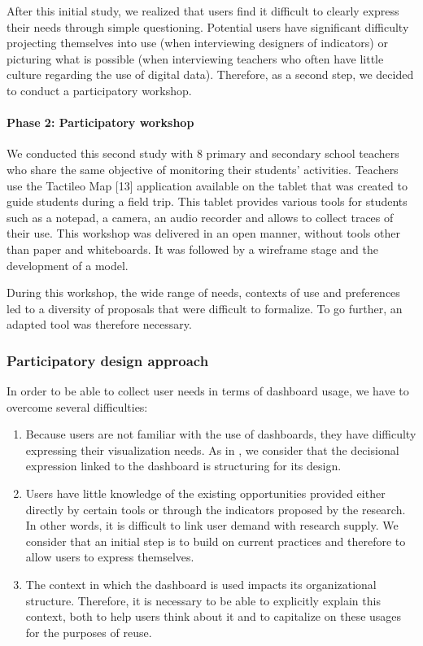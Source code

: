 \documentclass[manuscript,screen,nonacm,12pt]{acmart}
\begin{document}
After this initial study, we realized that users find it difficult to clearly express their needs through simple questioning. Potential users have significant difficulty projecting themselves into use (when interviewing designers of indicators) or picturing what is possible (when interviewing teachers who often have little culture regarding the use of digital data). Therefore, as a second step, we decided to conduct a participatory workshop.

\paragraph{Phase 2: Participatory workshop}
We conducted this second study with 8 primary and secondary school teachers who share the same objective of monitoring their students' activities. Teachers use the Tactileo Map [13] application available on the tablet that was created to guide students during a field trip. This tablet provides various tools for students such as a notepad, a camera, an audio recorder and allows to collect traces of their use. This workshop was delivered in an open manner, without tools other than paper and whiteboards. It was followed by a wireframe stage and the development of a model.

During this workshop, the wide range of needs, contexts of use and preferences led to a diversity of proposals that were difficult to formalize. To go further, an adapted tool was therefore necessary.


\subsubsection{Participatory design approach}
In order to be able to collect user needs in terms of dashboard usage, we have to overcome several difficulties:
\begin{enumerate}
    \item Because users are not familiar with the use of dashboards, they have difficulty expressing their visualization needs. As in \citet{xhakaj2017effects}, we consider that the decisional expression linked to the dashboard is structuring for its design.
    \item Users have little knowledge of the existing opportunities provided either directly by certain tools or through the indicators proposed by the research. In other words, it is difficult to link user demand with research supply. We consider that an initial step is to build on current practices and therefore to allow users to express themselves.
    \item The context in which the dashboard is used impacts its organizational structure. Therefore, it is necessary to be able to explicitly explain this context, both to help users think about it and to capitalize on these usages for the purposes of reuse.
\end{enumerate}
\end{document}
